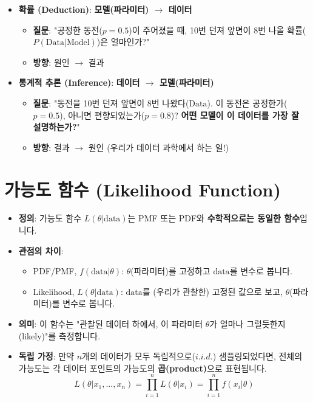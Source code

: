 \documentclass[11pt,a4paper]{book}
\theoremstyle{definition}
\begin{document}
\begin{tcolorbox}[colback=blue!5!white, colframe=blue!75!black, title={확률 (Probability) vs. 추론 (Inference)}]
\begin{itemize}
    \item \textbf{확률 (Deduction)}: \textbf{모델(파라미터) $\to$ 데이터}
        \begin{itemize}
            \item \textbf{질문}: "공정한 동전($p=0.5$)이 주어졌을 때, 10번 던져 앞면이 8번 나올 확률($P(\text{Data}|\text{Model})$)은 얼마인가?"
            \item \textbf{방향}: 원인 $\to$ 결과
        \end{itemize}
    \item \textbf{통계적 추론 (Inference)}: \textbf{데이터 $\to$ 모델(파라미터)}
        \begin{itemize}
            \item \textbf{질문}: "동전을 10번 던져 앞면이 8번 나왔다($\text{Data}$). 이 동전은 공정한가($p=0.5$), 아니면 편향되었는가($p=0.8$)? \textbf{어떤 모델이 이 데이터를 가장 잘 설명하는가?}"
            \item \textbf{방향}: 결과 $\to$ 원인 (우리가 데이터 과학에서 하는 일!)
        \end{itemize}
\end{itemize}
\end{tcolorbox}

\section{가능도 함수 (Likelihood Function)}

\begin{itemize}
    \item \textbf{정의}: 가능도 함수 $L(\theta | \text{data})$는 PMF 또는 PDF와 \textbf{수학적으로는 동일한 함수}입니다.
    \item \textbf{관점의 차이}:
        \begin{itemize}
            \item PDF/PMF, $f(\text{data} | \theta)$: $\theta$(파라미터)를 고정하고 $\text{data}$를 변수로 봅니다.
            \item Likelihood, $L(\theta | \text{data})$: $\text{data}$를 (우리가 관찰한) 고정된 값으로 보고, $\theta$(파라미터)를 변수로 봅니다.
        \end{itemize}
    \item \textbf{의미}: 이 함수는 "관찰된 데이터 하에서, 이 파라미터 $\theta$가 얼마나 그럴듯한지(likely)"를 측정합니다.
    \item \textbf{독립 가정}: 만약 $n$개의 데이터가 모두 독립적으로($i.i.d.$) 샘플링되었다면, 전체의 가능도는 각 데이터 포인트의 가능도의 \textbf{곱(product)}으로 표현됩니다.
    $$L(\theta | x_1, ..., x_n) = \prod_{i=1}^{n} L(\theta | x_i) = \prod_{i=1}^{n} f(x_i | \theta)$$
\end{itemize}
\end{document}
